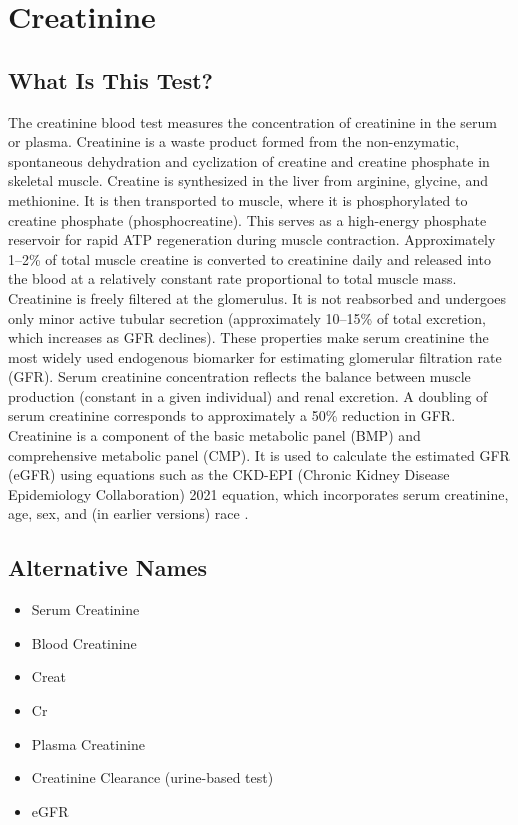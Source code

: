 \chapter{Creatinine}

\section*{What Is This Test?}
The creatinine blood test measures the concentration of creatinine in the serum or plasma. Creatinine is a waste product formed from the non-enzymatic, spontaneous dehydration and cyclization of creatine and creatine phosphate in skeletal muscle. Creatine is synthesized in the liver from arginine, glycine, and methionine. It is then transported to muscle, where it is phosphorylated to creatine phosphate (phosphocreatine). This serves as a high-energy phosphate reservoir for rapid ATP regeneration during muscle contraction. Approximately 1--2\% of total muscle creatine is converted to creatinine daily and released into the blood at a relatively constant rate proportional to total muscle mass. Creatinine is freely filtered at the glomerulus. It is not reabsorbed and undergoes only minor active tubular secretion (approximately 10--15\% of total excretion, which increases as GFR declines). These properties make serum creatinine the most widely used endogenous biomarker for estimating glomerular filtration rate (GFR). Serum creatinine concentration reflects the balance between muscle production (constant in a given individual) and renal excretion. A doubling of serum creatinine corresponds to approximately a 50\% reduction in GFR. Creatinine is a component of the basic metabolic panel (BMP) and comprehensive metabolic panel (CMP). It is used to calculate the estimated GFR (eGFR) using equations such as the CKD-EPI (Chronic Kidney Disease Epidemiology Collaboration) 2021 equation, which incorporates serum creatinine, age, sex, and (in earlier versions) race \cite{inker2021newequations}.

\section*{Alternative Names}
\begin{itemize}
  \item Serum Creatinine
  \item Blood Creatinine
  \item Creat
  \item Cr
  \item Plasma Creatinine
  \item Creatinine Clearance (urine-based test)
  \item eGFR
\end{itemize}
